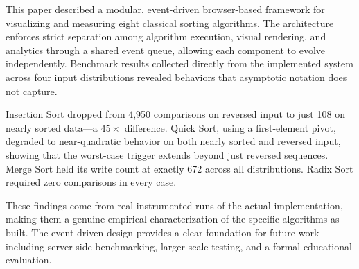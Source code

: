 \documentclass[conference]{IEEEtran}
\begin{document}
This paper described a modular, event-driven browser-based framework for
visualizing and measuring eight classical sorting algorithms. The architecture
enforces strict separation among algorithm execution, visual rendering, and
analytics through a shared event queue, allowing each component to evolve
independently. Benchmark results collected directly from the implemented system
across four input distributions revealed behaviors that asymptotic notation does
not capture.

Insertion Sort dropped from 4,950 comparisons on reversed input to just 108 on
nearly sorted data---a $45\times$ difference. Quick Sort, using a first-element
pivot, degraded to near-quadratic behavior on both nearly sorted and reversed
input, showing that the worst-case trigger extends beyond just reversed
sequences. Merge Sort held its write count at exactly 672 across all
distributions. Radix Sort required zero comparisons in every case.

These findings come from real instrumented runs of the actual implementation,
making them a genuine empirical characterization of the specific algorithms as
built. The event-driven design provides a clear foundation for future work
including server-side benchmarking, larger-scale testing, and a formal
educational evaluation.
\end{document}
